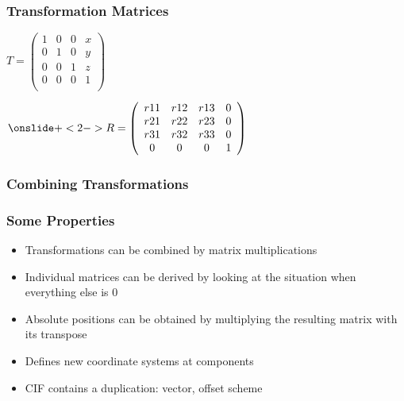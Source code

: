 \documentclass{beamer}
\begin{document}
\begin{frame} \frametitle{Transformation Matrices}
\begin{math}
T = \left( \begin{array}{cccc}
1 & 0 & 0 & x\\
0 & 1 & 0 & y\\
0 & 0 & 1 & z\\
0 & 0 & 0 & 1\\
\end{array} \right)
\end{math}

\begin{math}
\onslide+<2-> 
R = \left( \begin{array}{cccc}
r11 & r12 & r13 & 0\\
r21 & r22 & r23 & 0\\
r31 & r32 & r33 & 0\\
0 & 0 & 0 & 1\\
\end{array} \right)
\end{math}

\end{frame}

\begin{frame} \frametitle{Combining Transformations}
\begin{figure}[!ht]
\end{figure}
\end{frame}

\begin{frame} \frametitle{Some Properties}
\begin{itemize}
\item Transformations can be combined by matrix multiplications
\item Individual matrices can be derived by looking at the situation when everything else is 0
\item Absolute positions can be obtained by multiplying the resulting matrix with its transpose
\item Defines new coordinate systems at components
\item CIF contains a duplication: vector, offset scheme 
\end{itemize}
\end{frame}
\end{document}
